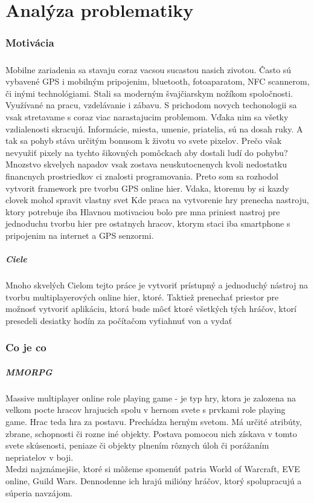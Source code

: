 \chapter*{Analýza problematiky}
\subsection{Motivácia}
\paragraph{}
Mobilne zariadenia sa stavaju coraz vacsou sucastou nasich zivotou. Často sú vybavené GPS i mobilným pripojenim, bluetooth, fotoaparatom, NFC scannerom, či inými technológiami. Stali sa moderným švajčiarskym nožíkom spoločnosti. Využívané na pracu, vzdelávanie i zábavu. S prichodom novych techonologii sa vsak stretavame s coraz viac narastajucim problemom. Vďaka nim sa všetky vzdialenosti skracujú. Informácie, miesta, umenie, priatelia, sú na dosah ruky. A tak sa pohyb stáva určitým bonusom k životu vo svete pixelov. Prečo však nevyužiť pixely na tychto šikovných pomôckach aby dostali ludí do pohybu?
Mnozstvo skvelych napadov vsak zostava neuskutocnenych kvoli nedostatku financnych prostriedkov ci znalosti programovania. Preto som sa rozhodol vytvorit framework pre tvorbu GPS online hier. Vdaka, ktoremu by si kazdy clovek mohol spravit vlastny svet  Kde praca na vytvorenie hry prenecha nastroju, ktory potrebuje iba 
Hlavnou motivaciou bolo pre mna priniest nastroj pre jednoduchu tvorbu hier pre ostatnych hracov, ktorym staci iba smartphone s pripojenim na internet a GPS senzormi.
\paragraph{Ciele}
Mnoho skvelých 
Cielom tejto práce je vytvoriť prístupný a jednoduchý nástroj na tvorbu multiplayerových online hier, ktoré. Taktiež prenechať priestor pre možnosť vytvoriť aplikáciu, ktorá bude môcť  ktoré všetkých tých hráčov, ktorí presedeli desiatky hodín za počítačom vyťiahnuť von a vydať

\subsection{Co je co}
\paragraph{MMORPG}
Massive multiplayer online role playing game - je typ hry, ktora je zalozena na velkom pocte hracov hrajucich spolu v hernom svete s prvkami role playing game. Hrac teda hra za postavu. Prechádza herným svetom. Má určité atribúty, zbrane, schopnosti či rozne iné objekty. Postava pomocou nich získava v tomto svete skúsenosti, peniaze či objekty plnením rôznych úloh či porážaním nepriatelov v boji. \\
Medzi najznámejšie, ktoré si môžeme spomenúť patria World of Warcraft, EVE online, Guild Wars. Dennodenne ich hrajú milióny hráčov, ktorý spolupracujú a súperia navzájom.

